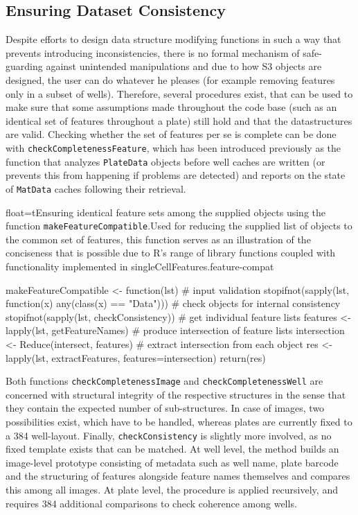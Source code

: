 \subsection{Ensuring Dataset Consistency}
Despite efforts to design data structure modifying functions in such a way that prevents introducing inconsistencies, there is no formal mechanism of safe-guarding against unintended manipulations and due to how S3 objects are designed, the user can do whatever he pleases (for example removing features only in a subset of wells). Therefore, several procedures exist, that can be used to make sure that some assumptions made throughout the code base (such as an identical set of features throughout a plate) still hold and that the datastructures are valid. Checking whether the set of features per se is complete can be done with \texttt{checkCompletenessFeature}, which has been introduced previously as the function that analyzes \texttt{PlateData} objects before well caches are written (or prevents this from happening if problems are detected) and reports on the state of \texttt{MatData} caches following their retrieval.

\begin{rlisting}{float=t}{Ensuring identical feature sets among the supplied objects using the function \texttt{makeFeatureCompatible}.}{Used for reducing the supplied list of objects to the common set of features, this function serves as an illustration of the conciseness that is possible due to R's range of library functions coupled with functionality implemented in singleCellFeatures.}{feature-compat}
\begin{rcode}
makeFeatureCompatible <- function(lst) {
  # input validation
  stopifnot(sapply(lst, function(x) any(class(x) == "Data")))
  # check objects for internal consistency
  stopifnot(sapply(lst, checkConsistency))
  # get individual feature lists
  features <- lapply(lst, getFeatureNames)
  # produce intersection of feature lists
  intersection <- Reduce(intersect, features)
  # extract intersection from each object
  res <- lapply(lst, extractFeatures, features=intersection)
  return(res)
}
\end{rcode}
\end{rlisting}

Both functions \texttt{checkCompletenessImage} and \texttt{checkCompletenessWell} are concerned with structural integrity of the respective structures in the sense that they contain the expected number of sub-structures. In case of images, two possibilities exist, which have to be handled, whereas plates are currently fixed to a 384 well-layout. Finally, \texttt{checkConsistency} is slightly more involved, as no fixed template exists that can be matched. At well level, the method builds an image-level prototype consisting of metadata such as well name, plate barcode and the structuring of features alongside feature names themselves and compares this among all images. At plate level, the procedure is applied recursively, and requires 384 additional comparisons to check coherence among wells.


